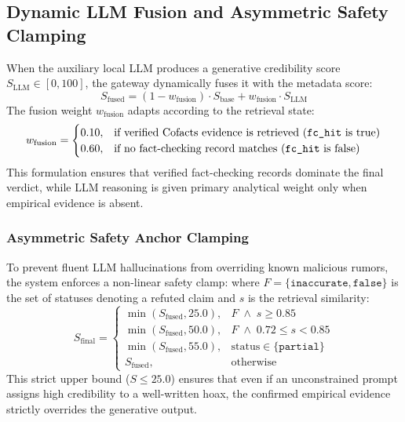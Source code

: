 \documentclass[twoside]{llncs}
\begin{document}
\subsection{Dynamic LLM Fusion and Asymmetric Safety Clamping}
When the auxiliary local LLM produces a generative credibility score $S_{\text{LLM}} \in [0, 100]$, the gateway dynamically fuses it with the metadata score:
\begin{equation}
S_{\text{fused}} = (1 - w_{\text{fusion}}) \cdot S_{\text{base}} + w_{\text{fusion}} \cdot S_{\text{LLM}}
\end{equation}
The fusion weight $w_{\text{fusion}}$ adapts according to the retrieval state:
\begin{equation}
w_{\text{fusion}} = 
\begin{cases}
0.10, & \text{if verified Cofacts evidence is retrieved (\texttt{fc\_hit} is true)} \\
0.60, & \text{if no fact-checking record matches (\texttt{fc\_hit} is false)}
\end{cases}
\end{equation}
This formulation ensures that verified fact-checking records dominate the final verdict, while LLM reasoning is given primary analytical weight only when empirical evidence is absent.

\subsubsection{Asymmetric Safety Anchor Clamping}
\label{sec:clamp}
To prevent fluent LLM hallucinations from overriding known malicious rumors, the system enforces a non-linear safety clamp:
where $F = \{\texttt{inaccurate}, \texttt{false}\}$ is the set of statuses denoting a refuted claim and $s$ is the retrieval similarity:
\begin{equation}
S_{\text{final}} =
\begin{cases}
\min(S_{\text{fused}}, 25.0), & F \;\wedge\; s \ge 0.85 \\
\min(S_{\text{fused}}, 50.0), & F \;\wedge\; 0.72 \le s < 0.85 \\
\min(S_{\text{fused}}, 55.0), & \text{status} \in \{\texttt{partial}\} \\
S_{\text{fused}}, & \text{otherwise}
\end{cases}
\end{equation}
This strict upper bound ($S \le 25.0$) ensures that even if an unconstrained prompt assigns high credibility to a well-written hoax, the confirmed empirical evidence strictly overrides the generative output.
\end{document}
